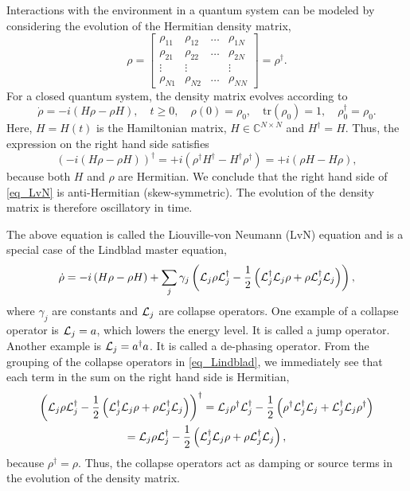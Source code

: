 \documentclass[11pt]{article}
\begin{document}
Interactions with the environment in a quantum system can be modeled
by considering the evolution of the Hermitian density matrix,
\[
\rho =
\begin{bmatrix}
\rho_{11} & \rho_{12} & \ldots & \rho_{1N} \\
\rho_{21} & \rho_{22} & \ldots & \rho_{2N} \\
\vdots    & \vdots    &           & \vdots \\
\rho_{N1} & \rho_{N2} & \ldots & \rho_{NN}
\end{bmatrix}
%
= \rho^\dag.
\]
For a closed quantum system, the density matrix evolves according to
\begin{equation}\label{eq_LvN}
\dot{\rho} = -i\left(H\rho - \rho H\right),\quad t\geq 0, \quad
\rho(0) = \rho_0,\quad \mbox{tr$(\rho_0)$} = 1,\quad \rho_0^\dag = \rho_0.
\end{equation}
Here, $H = H(t)$ is the Hamiltonian matrix, $H\in{\mathbb C}^{N\times N}$ and $H^\dag = H$. Thus,
the expression on the right hand side satisfies
\[
\left( -i\left(H\rho - \rho H\right) \right)^\dag = +i \left( \rho^\dag H^\dag - H^\dag \rho^\dag
\right)
%
= +i \left( \rho H - H \rho \right),
\]
because both $H$ and $\rho$ are Hermitian. We conclude that the right hand side of \eqref{eq_LvN} is
anti-Hermitian (skew-symmetric). The evolution of the density matrix is therefore oscillatory in
time.

The above equation is called the Liouville-von Neumann (LvN) equation and is a special case of the
Lindblad master equation,
\begin{equation}\label{eq_Lindblad}
\dot{\rho} = -i\left(H\rho - \rho H\right) + \sum_j \gamma_j\left( {\cal L}_j \rho {\cal L}_j^\dag -
\frac{1}{2}\left( {\cal L}_j^\dag{\cal L}_j\rho + \rho{\cal L}_j^\dag{\cal L}_j \right) \right),
\end{equation}
where $\gamma_j$ are constants and ${\cal L}_j$ are collapse operators. One example of a collapse
operator is ${\cal L}_j = a$, which lowers the energy level. It is called a jump operator. Another
example is ${\cal L}_j = a^\dag a$. It is called a de-phasing operator. From the grouping of the
collapse operators in \eqref{eq_Lindblad}, we immediately see that each term in the sum on the right
hand side is Hermitian,
\begin{multline*}
\left( {\cal L}_j \rho {\cal L}_j^\dag -
\frac{1}{2}\left( {\cal L}_j^\dag{\cal L}_j\rho + \rho{\cal L}_j^\dag{\cal L}_j \right) \right)^\dag
=
%
 {\cal L}_j \rho^\dag {\cal L}_j^\dag -
 \frac{1}{2}\left( \rho^\dag{\cal L}_j^\dag{\cal L}_j + {\cal L}_j^\dag{\cal L}_j\rho^\dag \right) \\
= {\cal L}_j \rho {\cal L}_j^\dag - \frac{1}{2}\left( {\cal L}_j^\dag{\cal L}_j\rho + \rho{\cal L}_j^\dag{\cal L}_j \right),
\end{multline*}
because $\rho^\dag = \rho$. Thus, the collapse operators act as damping or source terms in the
evolution of the density matrix.
\end{document}
